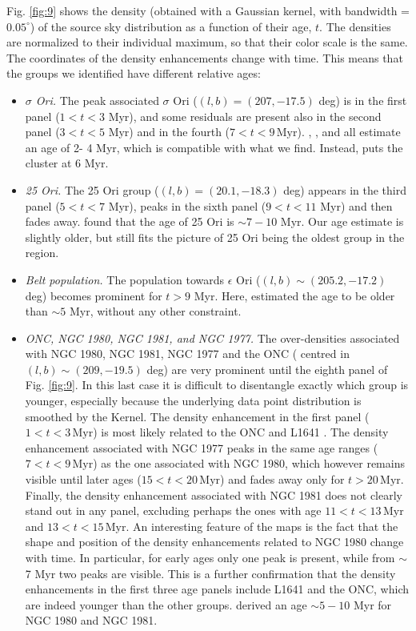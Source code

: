 \documentclass[twocolumn]{aa}
\begin{document}
Fig. \ref{fig:9} shows the density (obtained with a Gaussian kernel, with bandwidth = $0.05^{\circ}$) of the source sky distribution as a function of their age, $t$. The densities are normalized to their individual maximum, so that their color scale is the same. The coordinates of the density enhancements change with time. This means that the groups we identified have different relative ages:
\begin{itemize}
\item \textit{$\sigma$ Ori.}
The peak associated $\sigma$ Ori ($(l, b) = (207, -17.5)$ deg) is in the first panel ($1 < t < 3$ Myr), and some residuals are present also in the second panel ($3 < t < 5$ Myr) and in the fourth ($7 < t < 9 \, \mathrm{Myr}$). 
\cite{Hernandez2007}, \cite{Sherry2008}, and \cite{Zapatero2002}  all  estimate an age  of  2-
4 Myr, which is compatible with what we find. Instead, \cite{Bell2013} puts the cluster at 6 Myr. 

\item \textit{25 Ori.}
The 25 Ori group ($(l, b) = (20.1, -18.3)$ deg) appears in the third panel ($5 < t < 7 $ Myr), peaks in the sixth panel ($9 < t < 11 $ Myr) and then fades away. \cite{Briceno2007} found that the age of 25 Ori is $\sim 7-10$ Myr. Our age estimate is slightly older, but still fits the picture of 25 Ori being the oldest group in the region. 

\item{\textit{Belt population.}}
The population towards $\epsilon$ Ori ($(l, b) \sim (205.2, -17.2)$ deg) becomes prominent for $t >  9$ Myr. Here, \cite{Kubiak2016} estimated the age to be older than $\sim 5$ Myr, without any other constraint.

\item{\textit{ONC, NGC 1980, NGC 1981, and NGC 1977.}}
The over-densities associated with NGC 1980, NGC 1981, NGC 1977 and the ONC ( centred in $(l, b) \sim (209, -19.5)$ deg)  are very prominent until the eighth  panel of Fig. \ref{fig:9}. In this last case it is difficult to disentangle exactly which group is younger, especially because the underlying data point distribution is smoothed by the Kernel.
The density enhancement in the first panel ($1 < t < 3 \, \mathrm{Myr}$) is most likely related to the ONC and L1641 \citep{Reggiani2011, DaRio2014, DaRio2016}.
The density enhancement associated with NGC 1977 peaks in the same age ranges  ($7 < t < 9 \, \mathrm{Myr}$) as the one associated with NGC 1980, which however remains visible until later ages ($15 < t < 20 \, \mathrm{Myr}$) and fades away only for $t > 20 \, \mathrm{Myr}$. Finally, the density enhancement associated with NGC 1981 does not clearly stand out in any panel, excluding perhaps the ones with age $11 < t < 13 \, \mathrm{Myr}$ and $13 < t < 15 \, \mathrm{Myr}$. 
An interesting feature of the maps is the fact that the shape and position of the density enhancements related to NGC 1980 change with time. In particular, for early ages only one peak is present, while from $\sim$7 Myr two peaks are visible. This is a further confirmation that the density enhancements in 
the first three age panels include L1641 and the ONC, which are indeed younger than the other groups. 
\cite{Bouy2014} derived an age $\sim 5-10$ Myr for NGC 1980 and NGC 1981.


\end{itemize}
\end{document}
